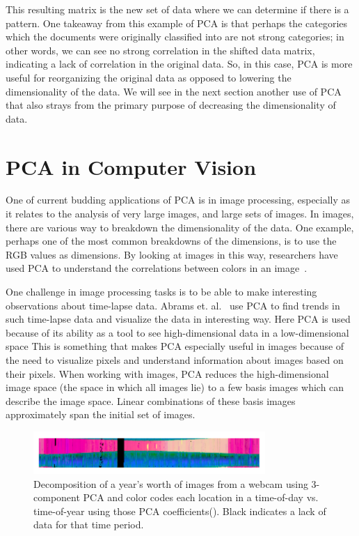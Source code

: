 \documentclass[11pt]{article}
\begin{document}
This resulting matrix is the new set of data where we can determine if there is a pattern. One takeaway from this example of PCA is that perhaps the categories which the documents were originally classified into are not strong categories; in other words, we can see no strong correlation in the shifted data matrix, indicating a lack of correlation in the original data. So, in this case, PCA is more useful for reorganizing the original data as opposed to lowering the dimensionality of the data. We will see in the next section another use of PCA that also strays from the primary purpose of decreasing the dimensionality of data. 

\section{PCA in Computer Vision} \label{pca-vision}
One of current budding applications of PCA is in image processing, especially as it relates to the analysis of very large images, and large sets of images. In images, there are various way to breakdown the dimensionality of the data. One example, perhaps one of the most common breakdowns of the dimensions, is to use the RGB values as dimensions. By looking at images in this way, researchers have used PCA to understand the correlations between colors in an image~\cite{image-process-pca}. 

One challenge in image processing tasks is to be able to make interesting observations about time-lapse data. Abrams et. al.~\cite{fspca} use PCA to find trends in such time-lapse data and visualize the data in interesting way. Here PCA is used because of its ability as a tool to see high-dimensional data in a low-dimensional space This is something that makes PCA especially useful in images because of the need to visualize pixels and understand information about images based on their pixels. When working with images, PCA reduces the high-dimensional image space (the space in which all images lie) to a few basis images which can describe the image space. Linear combinations of these basis images approximately span the initial set of images. 

\begin{figure}
\includegraphics[scale=0.6]{fspca_year}
\caption{Decomposition of a year's worth of images from a webcam using 3-component PCA and color codes each location in a time-of-day vs. time-of-year using those PCA coefficients(\hspace{1sp}\cite{fspca}). Black indicates a lack of data for that time period.}
\label{fig:fspca-year}
\end{figure}
\end{document}
